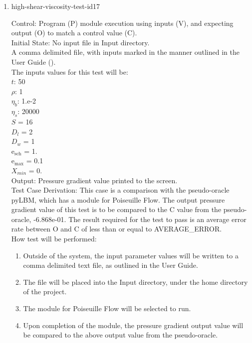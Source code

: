 \documentclass[12pt, titlepage]{article}
\begin{document}
\begin{enumerate}
\item{high-shear-viscosity-test-id17\\}

Control: Program (P) module execution using inputs (V), and expecting output (O) to match a control value (C).\\
					
Initial State: No input file in Input directory.\\
					
A comma delimited file, with inputs marked in the manner outlined in the User Guide (\citet{LBM_UserGuide_PM}).\\The inputs values for this test will be:\\
$t$: 50\\
$\rho$: 1\\
$\eta_b$: 1.e-2\\
$\eta_s$: 20000\\
$S$ = 16\\
$D_{l}$ = 2\\
$D_{w}$ = 1\\
$\mathrm{e_{sch}}$ = 1.\\
$\mathrm{e_{max}}$ = 0.1\\
$X_{min}$ = 0.\\

					
Output: Pressure gradient value printed to the screen. \\ 

Test Case Derivation: This case is a comparison with the pseudo-oracle pyLBM, which has a module for Poiseuille Flow. The output pressure gradient value of this test is to be compared to the C value from the pseudo-oracle, -6.868e-01. The result required for the test to pass is an average error rate between O and C of less than or equal to AVERAGE\_ERROR.\\

					
How test will be performed: 

\begin{enumerate}
\item Outside of the system, the input parameter values will be written to a comma delimited text file, as outlined in the User Guide.
\item The file will be placed into the Input directory, under the home directory of the project.
\item The module for Poiseuille Flow will be selected to run.
\item Upon completion of the module, the pressure gradient output value will be compared to the above output value from the pseudo-oracle.
\end{enumerate}	

\end{enumerate}
\end{document}
